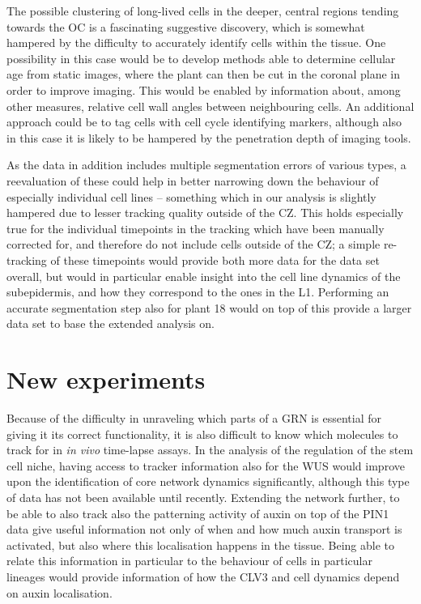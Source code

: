 The possible clustering of long-lived cells in the deeper, central regions
tending towards the OC is a fascinating suggestive discovery, which is somewhat
hampered by the difficulty to accurately identify cells within the tissue.
One possibility in this case would be to develop methods able to determine
cellular age from static images, where the plant can then be cut in the coronal
plane in order to improve imaging. This would be enabled by information about, among
other measures, relative cell wall angles between neighbouring cells. An
additional approach could be to tag cells with cell cycle identifying markers,
although also in this case it is likely to be hampered by the penetration depth
of imaging tools.

As the data in addition includes multiple segmentation errors of various types,
a reevaluation of these could help in better narrowing down the behaviour of
especially individual cell lines -- something which in our analysis is slightly
hampered due to lesser tracking quality outside of the CZ. This holds especially
true for the individual timepoints in the tracking which have been manually
corrected for, and therefore do not include cells outside of the CZ; a simple
re-tracking of these timepoints would provide both more data for the data set
overall, but would in particular enable insight into the cell line dynamics of
the subepidermis, and how they correspond to the ones in the L1. Performing an
accurate segmentation step also for plant 18 would on top of this provide a
larger data set to base the extended analysis on.

\section{New experiments}
Because of the difficulty in unraveling which parts of a GRN is essential for
giving it its correct functionality, it is also difficult to know which
molecules to track for in \textit{in vivo} time-lapse assays.
In the analysis of the regulation of the stem cell niche, having access to
tracker information also for the WUS would improve upon the identification of
core network dynamics significantly, although this type of data has not been
available until recently. Extending the network further, to be able to also
track also the patterning activity of auxin on top of the PIN1 data give useful
information not only of when and how much auxin transport is activated, but also
where this localisation happens in the tissue. Being able to relate this
information in particular to the behaviour of cells in particular lineages would
provide information of how the CLV3 and cell dynamics depend on auxin localisation.

